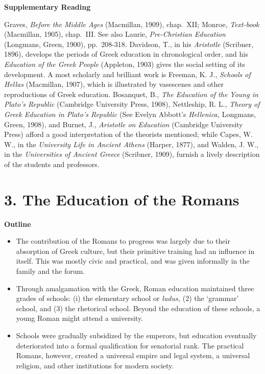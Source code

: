 \documentclass[
]{book}
\providecommand{\tightlist}{%
  \setlength{\itemsep}{0pt}\setlength{\parskip}{0pt}}
\begin{document}
\textbf{Supplementary Reading}

Graves, \emph{Before the Middle Ages} (Macmillan, 1909), chap.~XII; Monroe, \emph{Text-book} (Macmillan, 1905), chap.~III. See also Laurie, \emph{Pre-Christian Education} (Longmans, Green, 1900), pp.~208-318. Davidson, T., in his \emph{Aristotle} (Scribner, 1896), develops the periods of Greek education in chronological order, and his \emph{Education of the Greek People} (Appleton, 1903) gives the social setting of its development. A most scholarly and brilliant work is Freeman, K. J., \emph{Schools of Hellas} (Macmillan, 1907), which is illustrated by vasescenes and other reproductions of Greek education. Bosanquet, B., \emph{The Education of the Young in Plato's Republic} (Cambridge University Press, 1908), Nettleship, R. L., \emph{Theory of Greek Education in Plato's Republic} (See Evelyn Abbott's \emph{Hellenica,} Longmans, Green, 1908), and Burnet, J., \emph{Aristotle on Education} (Cambridge University Press) afford a good interpretation of the theorists mentioned; while Capes, W. W., in the \emph{University Life in Ancient Athens} (Harper, 1877), and Walden, J. W., in the \emph{Universities of Ancient Greece} (Scribner, 1909), furnish a lively description of the students and professors.

\hypertarget{the-education-of-the-romans}{%
\chapter{3. The Education of the Romans}\label{the-education-of-the-romans}}

\textbf{Outline}

\begin{itemize}
\tightlist
\item
  The contribution of the Romans to progress was largely due to their absorption of Greek culture, but their primitive training had an influence in itself. This was mostly civic and practical, and was given informally in the family and the forum.
\item
  Through amalgamation with the Greek, Roman education maintained three grades of schools: (i) the elementary school or \emph{ludus,} (2) the `grammar' school, and (3) the rhetorical school. Beyond the education of these schools, a young Roman might attend a university.
\item
  Schools were gradually subsidized by the emperors, but education eventually deteriorated into a formal qualification for senatorial rank. The practical Romans, however, created a universal empire and legal system, a universal religion, and other institutions for modern society.
\end{itemize}
\end{document}
